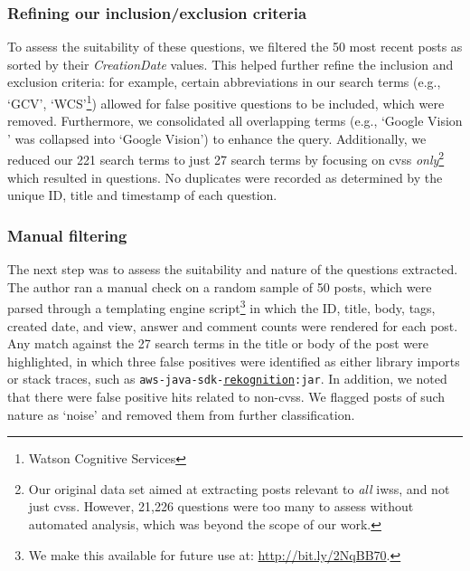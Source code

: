 \subsubsection{Refining our inclusion/exclusion criteria}
\label{semotion2020:ssec:method:filtering:refining}

To assess the suitability of these questions, we filtered the 50 most recent posts as sorted by their \textit{CreationDate} values. This helped further refine the inclusion and exclusion criteria: for example, certain abbreviations in our search terms (e.g., `GCV', `WCS'\footnote{Watson Cognitive Services}) allowed for false positive questions to be included, which were removed. Furthermore, we consolidated all overlapping terms (e.g., `Google Vision \underline{\textbf{}}' was collapsed into `Google Vision') to enhance the query. Additionally, we reduced our 221 search terms to just 27 search terms by focusing on \glspl{cvs} \textit{only}\footnote{Our original data set aimed at extracting posts relevant to \textit{all} \glspl{iws}, and not just \glspl{cvs}. However, 21,226 questions were too many to assess without automated analysis, which was beyond the scope of our work.} which resulted in \SEMNumPostsFromSO{} questions. No duplicates were recorded as determined by the unique ID, title and timestamp of each question.

\subsubsection{Manual filtering}
\label{semotion2020:ssec:method:filtering:automated-manual-filtering}

The next step was to assess the suitability and nature of the \SEMNumPostsFromSO{} questions extracted. The \alexnumauthor{} author ran a manual check on a random sample of 50 posts, which were parsed through a templating engine script\footnote{We make this available for future use at: \url{http://bit.ly/2NqBB70}.} in which the ID, title, body, tags, created date, and view, answer and comment counts were rendered for each post.
Any match against the 27 search terms in the title or body of the post were highlighted, in which three false positives were identified as either library imports or stack traces, such as \texttt{aws-java-sdk-\underline{rekognition}:jar}. In addition, we noted that there were false positive hits related to non-\glspl{cvs}. We flagged posts of such nature as `noise' and removed them from further classification.

